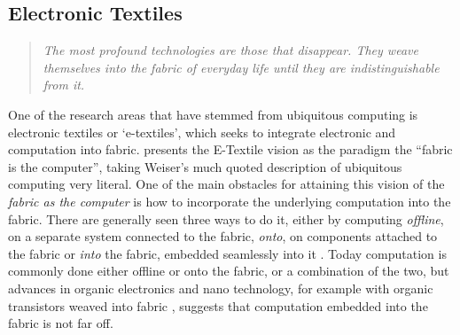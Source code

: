 \subsection{Electronic Textiles}
\label{ch:textiletouch:related:etextiles}
\begin{quotation}
\emph{The most profound technologies are those that disappear. They weave themselves into the fabric of everyday life until they are indistinguishable from it. \citep{weiser1991computer}}
\end{quotation}
One of the research areas that have stemmed from ubiquitous computing is electronic textiles or `e-textiles', which seeks to integrate electronic and computation into fabric.
\citet{park2002wearable} presents the E-Textile vision as the paradigm the ``fabric is the computer'', taking Weiser's much quoted description of ubiquitous computing very literal.
One of the main obstacles for attaining this vision of the \emph{fabric as the computer} is how to incorporate the underlying computation into the fabric.
There are generally seen three ways to do it, either by computing \emph{offline}, on a separate system connected to the fabric, \emph{onto}, on components attached to the fabric or \emph{into} the fabric, embedded seamlessly into it \citep{marculescu2003}.
Today computation is commonly done either offline or onto the fabric, or a combination of the two, but advances in organic electronics and nano technology, for example with organic transistors weaved into fabric \citep{lee2005weave}, suggests that computation embedded into the fabric is not far off.

